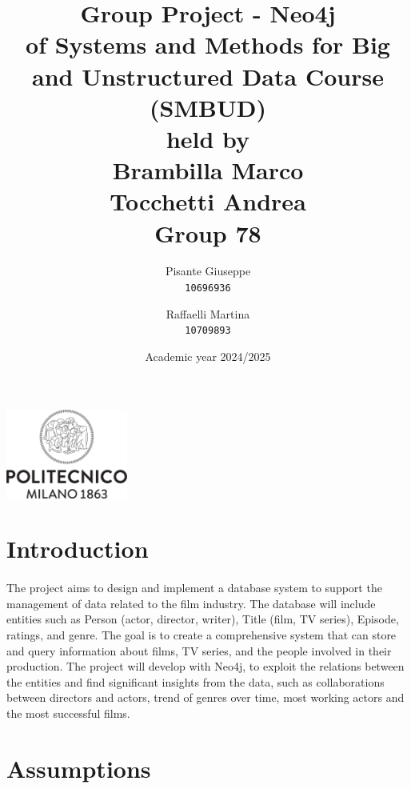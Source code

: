 \documentclass[a4paper,12pt]{article}
\begin{document}
\title{%
  Group Project - Neo4j \\
  \large of Systems and Methods for Big
    and Unstructured Data Course \\(SMBUD)\\
    held by\\ Brambilla Marco\\ Tocchetti Andrea \\
  \vspace{5mm}
  \Large \textbf{Group 78}}
\author{Pisante Giuseppe\\
  \texttt{10696936}
  \and
  Raffaelli Martina\\
  \texttt{10709893}
}
\date{Academic year 2024/2025}
\maketitle
\begin{center}
  \includegraphics[width=4cm]{polilogo.png}\\
\end{center}
\newpage
\tableofcontents
\newpage
\section{Introduction}
\paragraph{} The project aims to design and implement a database system to support the management of data related to the film industry. The database will include entities such as Person (actor, director, writer), Title (film, TV series), Episode, ratings, and genre. The goal is to create a comprehensive system that can store and query information about films, TV series, and the people involved in their production.
The project will develop with Neo4j, to exploit the relations between the entities and find significant insights from the data, such as collaborations between directors and actors, trend of genres over time, most working actors and the most successful films.
\section{Assumptions}
\end{document}
